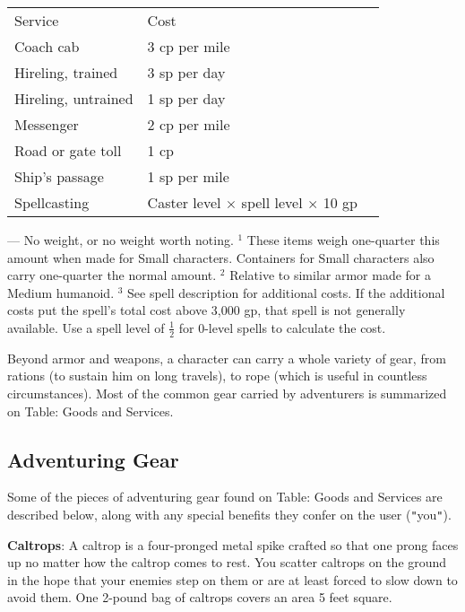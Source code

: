 \begin{table*}[]
\begin{tabular}{lll}
 Service & Cost\\
Coach cab & 3 cp per mile\\
Hireling, trained & 3 sp per day\\
Hireling, untrained & 1 sp per day\\
Messenger & 2 cp per mile\\
Road or gate toll & 1 cp\\
Ship's passage & 1 sp per mile\\
Spellcasting & Caster level $\times$ spell level $\times$ 10 gp\\
\end{tabular}
--- No weight, or no weight worth noting.
\(^{1}\) These items weigh one-quarter this amount when made for Small characters. Containers for Small characters also carry one-quarter the normal amount.
\(^{2}\) Relative to similar armor made for a Medium humanoid.
\(^{3}\) See spell description for additional costs. If the additional costs put the spell's total cost above 3,000 gp, that spell is not generally available. Use a spell level of \mbox{$\frac12$} for 0-level spells to calculate the cost.

\end{table*}
	
Beyond armor and weapons, a character can carry a whole variety of gear, from rations (to sustain him on long travels), to rope (which is useful in countless circumstances). Most of the common gear carried by adventurers is summarized on Table: Goods and Services.
	
\subsection{Adventuring Gear}

		
Some of the pieces of adventuring gear found on Table: Goods and Services are described below, along with any special benefits they confer on the user (\texttt{{}"{}}you\texttt{{}"{}}).
		
\textbf{Caltrops}: A caltrop is a four-pronged metal spike crafted so that one prong faces up no matter how the caltrop comes to rest. You scatter caltrops on the ground in the hope that your enemies step on them or are at least forced to slow down to avoid them. One 2-pound bag of caltrops covers an area 5 feet square.
		
